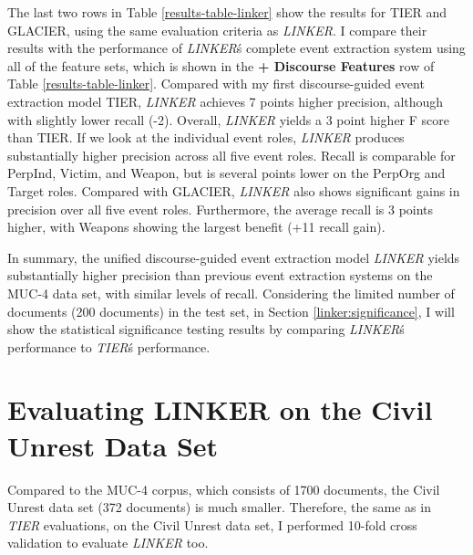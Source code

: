 
The last two rows in Table \ref{results-table-linker} show the results for
TIER and GLACIER, using the same evaluation criteria as {\it LINKER}.
I compare their results with the performance of {\it LINKER}\'s complete event
extraction system using all of the feature sets, which is shown in the
{\bf + Discourse Features} row of Table \ref{results-table-linker}.
Compared with my first discourse-guided event extraction model TIER, 
{\it LINKER} achieves 7 points higher
precision, although with slightly lower recall (-2). Overall, {\it LINKER} 
yields a 3 point higher F score than TIER. If we look at the
individual event roles, {\it LINKER} produces substantially higher
precision across all five event roles.  Recall is comparable for
PerpInd, Victim, and Weapon, but is several points lower on the PerpOrg and
Target roles. 
Compared with GLACIER, {\it LINKER} also shows
significant gains in precision over all five event roles.  Furthermore, the
average recall is 3 points higher, with Weapons showing the largest
benefit (+11 recall gain).


In summary, the unified discourse-guided event extraction model {\it LINKER} 
yields substantially
higher precision than previous event extraction systems on the MUC-4
data set, with similar levels of recall. 
Considering the limited number of documents (200 documents) in the test set, 
in Section \ref{linker:significance}, I will show the statistical significance testing results 
by comparing {\it LINKER}\'s performance to {\it TIER}\'s 
performance.

\section{Evaluating LINKER on the Civil Unrest Data Set}

Compared to the MUC-4 corpus, which consists of 1700 documents, the 
Civil Unrest data set (372 documents) is much smaller.
Therefore, the same as in 
{\it TIER} evaluations, 
on the Civil Unrest data set, 
I performed 10-fold cross validation to evaluate {\it LINKER} too.

